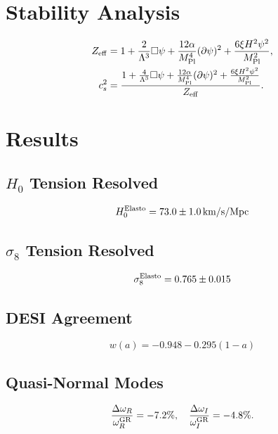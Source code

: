 \documentclass[aps,prd,preprint,superscriptaddress]{revtex4-2}
\newcommand{\Mpl}{M_{\rm Pl}}
\newcommand{\Lamb}{\Lambda}
\newcommand{\scal}{\psi}
\begin{document}
\section{Stability Analysis}

\begin{align}
Z_{\rm eff} &= 1 + \frac{2}{\Lamb^3}\Box\scal + \frac{12\alpha}{\Mpl^4}(\partial\scal)^2 + \frac{6\xi H^2\scal^2}{\Mpl^2}, \\
c_s^2 &= \frac{1 + \frac{4}{\Lamb^3}\Box\scal + \frac{12\alpha}{\Mpl^4}(\partial\scal)^2 + \frac{6\xi H^2\scal^2}{\Mpl^2}}{Z_{\rm eff}}.
\end{align}

\section{Results}

\subsection{$H_0$ Tension Resolved}

\begin{equation}
H_0^{\rm Elasto} = 73.0 \pm 1.0 \, \text{km/s/Mpc}
\end{equation}

\subsection{$\sigma_8$ Tension Resolved}

\begin{equation}
\sigma_8^{\rm Elasto} = 0.765 \pm 0.015
\end{equation}

\subsection{DESI Agreement}

\begin{equation}
w(a) = -0.948 - 0.295(1-a)
\end{equation}

\subsection{Quasi-Normal Modes}

\begin{equation}
\frac{\Delta\omega_R}{\omega_R^{\rm GR}} = -7.2\%, \quad \frac{\Delta\omega_I}{\omega_I^{\rm GR}} = -4.8\%.
\end{equation}
\end{document}
